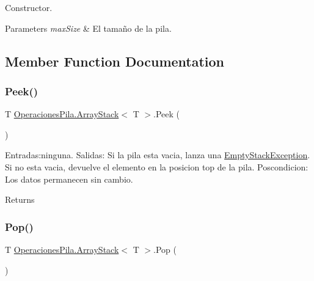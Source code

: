 Constructor. 


\begin{DoxyParams}{Parameters}
{\em max\+Size} & El tamaño de la pila.\\
\hline
\end{DoxyParams}


\subsection{Member Function Documentation}
\mbox{\label{class_operaciones_pila_1_1_array_stack_ac0b80f6ed3ef56c01e9fd4c847504444}} 
\subsubsection{\texorpdfstring{Peek()}{Peek()}}
{\footnotesize\ttfamily T \hyperlink{class_operaciones_pila_1_1_array_stack}{Operaciones\+Pila.\+Array\+Stack}$<$ T $>$.Peek (\begin{DoxyParamCaption}{ }\end{DoxyParamCaption})\hspace{0.3cm}{\ttfamily [inline]}}



Entradas\+:ninguna. Salidas\+: Si la pila esta vacia, lanza una \hyperlink{class_operaciones_pila_1_1_empty_stack_exception}{Empty\+Stack\+Exception}. Si no esta vacia, devuelve el elemento en la posicion top de la pila. Poscondicion\+: Los datos permanecen sin cambio. 

\begin{DoxyReturn}{Returns}

\end{DoxyReturn}
\mbox{\label{class_operaciones_pila_1_1_array_stack_a077d65f90d9b421a881dab181e136147}} 
\subsubsection{\texorpdfstring{Pop()}{Pop()}}
{\footnotesize\ttfamily T \hyperlink{class_operaciones_pila_1_1_array_stack}{Operaciones\+Pila.\+Array\+Stack}$<$ T $>$.Pop (\begin{DoxyParamCaption}{ }\end{DoxyParamCaption})\hspace{0.3cm}{\ttfamily [inline]}}



